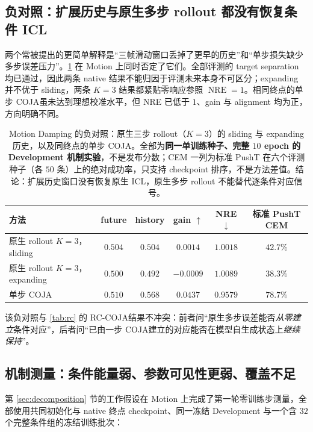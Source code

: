 \documentclass[UTF8,zihao=-4,fontset=fandol]{ctexart}
\newcommand{\method}{\textsc{COJA}}
\newcommand{\rcmethod}{\textsc{RC-COJA}}
\begin{document}
\subsection{负对照：扩展历史与原生多步 rollout 都没有恢复条件 ICL}
\label{sec:negctrl}

两个常被提出的更简单解释是“三帧滑动窗口丢掉了更早的历史”和“单步损失缺少多步误差压力”。\cref{tab:negctrl} 在 Motion 上同时否定了它们。全部评测的 target separation 均已通过，因此两条 native 结果不能归因于评测未来本身不可区分；expanding 并不优于 sliding，两条 $K=3$ 结果都紧贴零响应参照 $\operatorname{NRE}=1$。相同终点的单步 \method 虽未达到理想校准水平，但 NRE 已低于 $1$、gain 与 alignment 均为正，方向明确不同。

\begin{table}[t]
\centering
\small
\caption{Motion Damping 的负对照：原生三步 rollout（$K=3$）的 sliding 与 expanding 历史，以及同终点的单步 \method。全部为\textbf{同一单训练种子、完整 $10$ epoch 的 Development 机制实验}，不是发布分数；CEM 一列为标准 PushT 在六个评测种子（各 $50$ 条）上的绝对成功率，只支持 checkpoint 排序，不是方法差值。结论：扩展历史窗口没有恢复原生 ICL，原生多步 rollout 不能替代逐条件对应信号。}
\label{tab:negctrl}
\begin{tabular}{@{}lccccc@{}}
\toprule
方法 & future & history & gain $\uparrow$ & NRE $\downarrow$ & 标准 PushT CEM \\
\midrule
原生 rollout $K=3$，sliding & $0.504$ & $0.504$ & $0.0014$ & $1.0018$ & $42.7\%$ \\
原生 rollout $K=3$，expanding & $0.500$ & $0.492$ & $-0.0009$ & $1.0089$ & $38.3\%$ \\
单步 \method & $0.510$ & $0.568$ & $0.0437$ & $0.9579$ & $78.7\%$ \\
\bottomrule
\end{tabular}
\end{table}

该负对照与 \cref{tab:rc} 的 \rcmethod 结果不冲突：前者问“原生多步误差能否\emph{从零建立}条件对应”，后者问“已由一步 \method 建立的对应能否在模型自生成状态上\emph{继续保持}”。

\subsection{机制测量：条件能量弱、参数可见性更弱、覆盖不足}
\label{sec:mechanism}

第 \ref{sec:decomposition} 节的工作假设在 Motion 上完成了第一轮零训练步测量，全部使用共同初始化与 native 终点 checkpoint、同一冻结 Development 与一个含 $32$ 个完整条件组的冻结训练批次：
\end{document}

